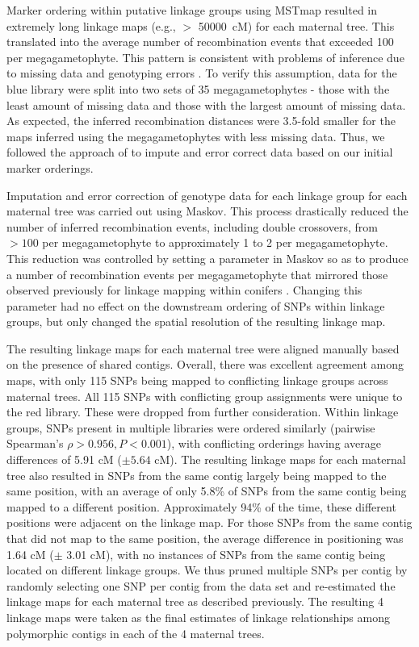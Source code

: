 \documentclass[smallextended]{svjour3}
\begin{document}
Marker ordering within putative linkage groups using MSTmap resulted in
extremely long linkage maps (e.g., $>$ \SI{50000} {cM}) for each maternal tree.
This translated into the average number of recombination events that exceeded
\num{100} per megagametophyte. This pattern is consistent with problems of
inference due to missing data and genotyping errors \citep{Ward:2013}. To verify
this assumption, data for the blue library were split into two sets of \num{35}
megagametophytes - those with the least amount of missing data and those with
the largest amount of missing data. As expected, the inferred recombination
distances were 3.5-fold smaller for the maps inferred using the megagametophytes
with less missing data. Thus, we followed the approach of \citet{Ward:2013} to
impute and error correct data based on our initial marker orderings.

Imputation and error correction of genotype data for each linkage group for each
maternal tree was carried out using Maskov. This process drastically reduced the
number of inferred recombination events, including double crossovers, from
$>100$ per megagametophyte to approximately \num{1} to \num{2} per
megagametophyte. This reduction was controlled by setting a parameter in Maskov
so as to produce a number of recombination events per megagametophyte that
mirrored those observed previously for linkage mapping within conifers
\citep{Eckert:2009, Martinez-Garcia:2013}. Changing this parameter had no effect
on the downstream ordering of SNPs within linkage groups, but only changed the
spatial resolution of the resulting linkage map.

The resulting linkage maps for each maternal tree were aligned manually based on
the presence of shared contigs. Overall, there was excellent agreement among
maps, with only 115 SNPs being mapped to conflicting linkage groups across
maternal trees. All 115 SNPs with conflicting group assignments were unique to
the red library. These were dropped from further consideration.  Within linkage
groups, SNPs present in multiple libraries were ordered similarly (pairwise
Spearman's $\rho > 0.956, P < 0.001$), with conflicting orderings having average
differences of \num{5.91} cM ($\pm 5.64$ cM). The resulting linkage maps for
each maternal tree also resulted in SNPs from the same contig largely being
mapped to the same position, with an average of only 5.8\% of SNPs from the same
contig being mapped to a different position.  Approximately 94\% of the time,
these different positions were adjacent on the linkage map. For those SNPs from
the same contig that did not map to the same position, the average difference in
positioning was 1.64 cM ($\pm$ 3.01 cM), with no instances of SNPs from the same
contig being located on different linkage groups. We thus pruned multiple SNPs
per contig by randomly selecting one SNP per contig from the data set and
re-estimated the linkage maps for each maternal tree as described previously.
The resulting \num{4} linkage maps were taken as the final estimates of linkage
relationships among polymorphic contigs in each of the \num{4} maternal trees.
\end{document}

